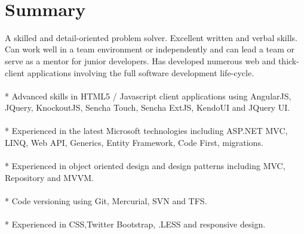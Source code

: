 \documentclass[10pt]{article} %
\begin{document}
\color{text1} %


\par{\\ %
\vspace{20pt}
	

\begin{minipage}[t]{0.5\textwidth} %
\vspace{0pt} %
	

\section{Summary} 
\normalsize{ A skilled and detail-oriented problem solver. Excellent written and verbal skills. Can work well in a team environment or independently and can lead a team or serve as a mentor for junior developers. Has developed numerous web and thick-client applications involving the full software development life-cycle.\\\\* Advanced skills in HTML5 / Javascript client applications using AngularJS, JQuery, KnockoutJS, Sencha Touch, Sencha ExtJS, KendoUI and JQuery UI.\\\\* Experienced in the latest Microsoft technologies including ASP.NET MVC, LINQ, Web API, Generics, Entity Framework, Code First, migrations.\\\\* Experienced in object oriented design and design patterns including MVC, Repository and MVVM.\\\\* Code versioning using Git, Mercurial, SVN and TFS.\\\\* Experienced in CSS,Twitter Bootstrap, .LESS and responsive design. }\\




\end{minipage}}
\end{document}
